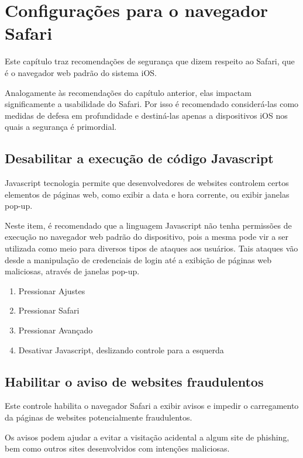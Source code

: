 \chapter{Configura\c c\~oes para o navegador Safari}

Este cap\'itulo traz recomenda\c c\~oes de seguran\c ca que dizem respeito ao Safari, que \'e o navegador web padr\~ao do sistema iOS. 

Analogamente \`as recomenda\c c\~oes do cap\'itulo anterior, elas impactam significamente a usabilidade do Safari. Por isso \'e recomendado consider\'a-las como medidas de defesa em profundidade e destin\'a-las apenas a dispositivos iOS nos quais a seguran\c ca \'e primordial.

\section{Desabilitar a execu\c c\~ao de c\'odigo Javascript}

Javascript tecnologia permite que desenvolvedores de websites controlem certos elementos de p\'aginas web, como exibir a data e hora corrente, ou exibir janelas pop-up. 

Neste item, \'e recomendado que a linguagem Javascript n\~ao tenha permiss\~oes de execu\c c\~ao no navegador web padr\~ao do dispositivo, pois a mesma pode vir a ser utilizada como meio para diversos tipos de ataques aos usu\'arios. Tais ataques v\~ao desde a manipula\c c\~ao de credenciais de login at\'e a exibi\c c\~ao de p\'aginas web maliciosas, atrav\'es de janelas pop-up.

\begin{enumerate}
\item Pressionar Ajustes
\item Pressionar Safari
\item Pressionar Avan\c cado
\item Desativar Javascript, deslizando  controle para a esquerda
\end{enumerate}

\section{Habilitar o aviso de websites fraudulentos}

Este controle habilita o navegador Safari a exibir avisos e impedir o carregamento da p\'aginas de websites potencialmente fraudulentos.

Os avisos podem ajudar a evitar a visita\c c\~ao acidental a algum site de phishing, bem como outros sites desenvolvidos com inten\c c\~oes maliciosas.

